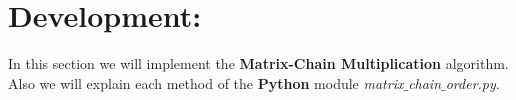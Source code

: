 \section{Development:}

In this section we will implement the {\bfseries Matrix-Chain Multiplication} algorithm. Also we will explain each method of the {\bfseries Python} module {\itshape matrix$\_$chain$\_$order.py}.
